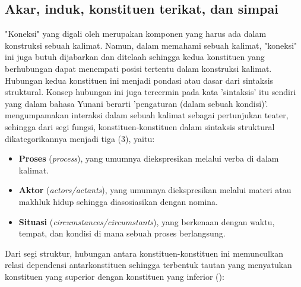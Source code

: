 \subsection{Akar, induk, konstituen terikat, dan simpai}
"Koneksi" yang digali oleh \cite{tesniere1959elements} merupakan komponen yang harus ada dalam konstruksi sebuah kalimat. Namun, dalam memahami sebuah kalimat, "koneksi" ini juga butuh dijabarkan dan ditelaah sehingga kedua konstituen yang berhubungan dapat menempati posisi tertentu dalam konstruksi kalimat. Hubungan kedua konstituen ini menjadi pondasi atau dasar dari sintaksis struktural. Konsep hubungan ini juga tercermin pada kata 'sintaksis' itu sendiri yang dalam bahasa Yunani berarti 'pengaturan (dalam sebuah kondisi)'. \cite{tesniere1959elements} mengumpamakan interaksi dalam sebuah kalimat sebagai pertunjukan teater, sehingga dari segi fungsi, konstituen-konstituen dalam sintaksis struktural dikategorikannya menjadi tiga (3), yaitu:
\begin{itemize}
\item \textbf{Proses} (\textit{process}), yang umumnya diekspresikan melalui verba di dalam kalimat.
\item \textbf{Aktor} (\textit{actors/actants}), yang umumnya diekspresikan melalui materi atau makhluk hidup sehingga diasosiasikan dengan nomina.
\item \textbf{Situasi} (\textit{circumstances/circumstants}), yang berkenaan dengan waktu, tempat, dan kondisi di mana sebuah proses berlangsung.
\end{itemize}
Dari segi struktur, hubungan antara konstituen-konstituen ini memunculkan relasi dependensi antarkonstituen sehingga terbentuk tautan yang menyatukan konstituen yang superior dengan konstituen yang inferior (\citealp{tesniere1959elements, hudson2010introduction, heringer1993dependency}): 
